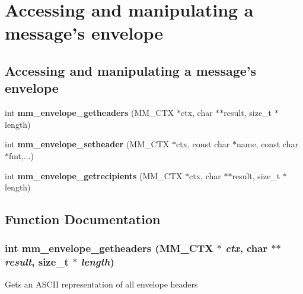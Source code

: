 \section{Accessing and manipulating a message's envelope}
\label{group__envelope}
\subsection*{Accessing and manipulating a message's envelope}
\begin{CompactItemize}
\item 
int {\bf mm\_\-envelope\_\-getheaders} (MM\_\-CTX $\ast$ctx, char $\ast$$\ast$result, size\_\-t $\ast$length)
\item 
int {\bf mm\_\-envelope\_\-setheader} (MM\_\-CTX $\ast$ctx, const char $\ast$name, const char $\ast$fmt,...)
\item 
int {\bf mm\_\-envelope\_\-getrecipients} (MM\_\-CTX $\ast$ctx, char $\ast$$\ast$result, size\_\-t $\ast$length)
\end{CompactItemize}


\subsection{Function Documentation}
\subsubsection{\setlength{\rightskip}{0pt plus 5cm}int mm\_\-envelope\_\-getheaders (MM\_\-CTX $\ast$ {\em ctx}, char $\ast$$\ast$ {\em result}, size\_\-t $\ast$ {\em length})}\label{group__envelope_g38f1164142cedfc3253b068a81f85563}


Gets an ASCII representation of all envelope headers

